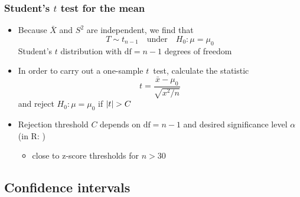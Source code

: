 \documentclass[t]{beamer} %
\begin{document}
\begin{frame}
  \frametitle{Student's $t$ test for the mean}

  \begin{itemize}
  \item Because $\bar{X}$ and $S^2$ are independent, we find that
    \[
    T \sim t_{n-1} \quad\text{under}\quad H_0: \mu = \mu_0
    \]
    Student's \h{$t$ distribution} with $\text{df} = n-1$ degrees of freedom
  \item In order to carry out a one-sample $t$~test, calculate the statistic
    \[
    t = \frac{\bar{x} - \mu_0}{\sqrt{x^2 / n}}    
    \]
    and reject $H_0: \mu=\mu_0$ if $\lvert t\rvert > C$
  \item Rejection threshold $C$ depends on $\text{df} = n-1$ and desired
    significance level $\alpha$ (in R: )
    \begin{itemize}
    \item[\hand] close to z-score thresholds for $n > 30$
    \end{itemize}
  \end{itemize}
\end{frame}

\subsection{Confidence intervals}
\end{document}
